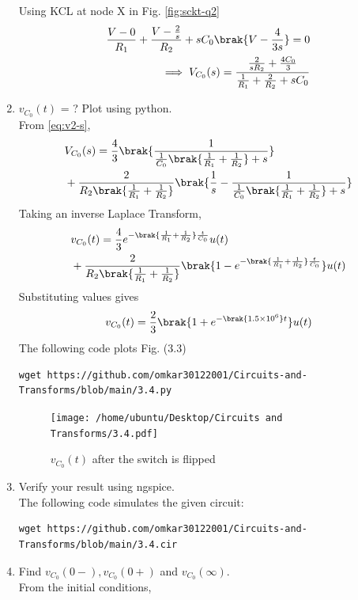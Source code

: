 \documentclass[journal,12pt,twocolumn]{IEEEtran}
\renewcommand\thesection{\arabic{section}}
\begin{document}
\begin{enumerate}[label=\arabic*.,ref=\thesection.\theenumi]
\solution
Using KCL at node X in Fig. \ref{fig:sckt-q2}
\begin{align}
	\frac{V - 0}{R_1} + \frac{V - \frac{2}{s}}{R_2} + sC_0\brak{V - \frac{4}{3s}} = 0 \\
	\implies V_{C_0}(s) = \frac{\frac{2}{sR_2} + \frac{4C_0}{3}}{\frac{1}{R_1} + \frac{2}{R_2} + sC_0}
	\label{eq:v2-s}
\end{align}
\item $v_{C_0}(t)$ = ? Plot using python. \\
\solution
From \eqref{eq:v2-s},
\begin{align}
	&V_{C_0}(s) = \frac{4}{3}\brak{\frac{1}{\frac{1}{C_0}\brak{\frac{1}{R_1} + \frac{1}{R_2}}+s}} \nonumber \\
	&+ \frac{2}{R_2\brak{\frac{1}{R_1} +\frac{1}{R_2}}}\brak{\frac{1}{s} - \frac{1}{\frac{1}{C_0}\brak{\frac{1}{R_1} + \frac{1}{R_2}} + s}}
\end{align}
Taking an inverse Laplace Transform,
\begin{align}
	&v_{C_0}(t) = \frac{4}{3}e^{-\brak{\frac{1}{R_1} + \frac{1}{R_2}}\frac{t}{C_0}}u(t) \nonumber \\ 
	&+ \frac{2}{R_2\brak{\frac{1}{R_1}+\frac{1}{R_2}}}\brak{1 - e^{-\brak{\frac{1}{R_1} + \frac{1}{R_2}}\frac{t}{C_0}}}u(t)
\end{align}
Substituting values gives
\begin{align}
	v_{C_0}(t) = \frac{2}{3}\brak{1 +e^{-\brak{1.5 \times 10^6}t}}u(t)
	\label{eq:v2-t}
\end{align}
The following code plots Fig. (3.3)
\begin{lstlisting}
wget https://github.com/omkar30122001/Circuits-and-Transforms/blob/main/3.4.py
\end{lstlisting}
\begin{figure}[!htb]
	\texttt{[image: /home/ubuntu/Desktop/Circuits and Transforms/3.4.pdf]}
	\caption{$v_{C_0}(t)$ after the switch is flipped}
	\label{fig:v2-t}
\end{figure}
\item Verify your result using ngspice. \\
\solution
The following code simulates the given circuit:
\begin{lstlisting}
wget https://github.com/omkar30122001/Circuits-and-Transforms/blob/main/3.4.cir
\end{lstlisting}
\item Find $v_{C_0}(0-), v_{C_0}(0+)$ and  $v_{C_0}(\infty) $. \\
\solution
From the initial conditions,

\end{enumerate}
\end{document}
